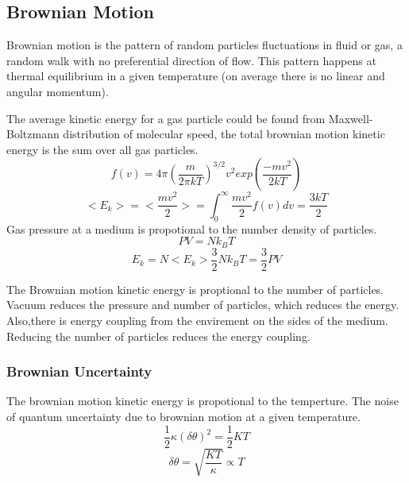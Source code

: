 \documentclass[\main/master.tex]{subfiles}
\begin{document}
\subsection{Brownian Motion}
Brownian motion is the pattern of random particles fluctuations in fluid or gas, a random walk with no preferential direction of flow. This pattern happens at thermal equilibrium in a given temperature (on average there is no linear and angular momentum). 
\par
The average kinetic energy for a gas particle could be found from Maxwell-Boltzmann distribution of molecular speed, the total brownian motion kinetic energy is the sum over all gas particles.
\begin{equation}
f(v) = 4\pi(\frac{m}{2\pi kT})^{3/2}v^2exp(\frac{-mv^2}{2kT})     \label{eqn:Maxwell_Boltzmann}
\end{equation}  
\begin{equation}
<E_k>=<\frac{mv^2}{2}> = \int_{0}^{\infty}\frac{mv^2}{2}f(v)dv =  \frac{3kT}{2}    \label{eqn:avrage_kinetic}
\end{equation}
Gas pressure at a medium is propotional to the number density of particles.    
\begin{equation}
PV = Nk_BT  \label{eqn:ideal-gasses}
\end{equation}
\begin{equation}
E_k=N<E_k> \frac{3}{2}Nk_BT = \frac{3}{2}PV    \label{eqn:total_kinetic}
\end{equation}

The Brownian motion kinetic energy is proptional to the number of particles. Vacuum reduces the pressure and number of particles, which reduces the energy. Also,there is energy coupling from the envirement on the sides of the medium. Reducing the number of particles reduces the energy coupling.
\subsubsection{Brownian Uncertainty}
The brownian motion kinetic energy is propotional to the temperture. The noise of quantum uncertainty due to brownian motion at a given temperature. 
\begin{equation}
\frac{1}{2}\kappa (\delta\theta)^2= \frac{1}{2}KT  \label{eqn:radiation force}
\end{equation}
\begin{equation}
\delta\theta = \sqrt{\frac{KT}{\kappa}}\propto{T}  \label{eqn:radiation force}
\end{equation}
\end{document}
